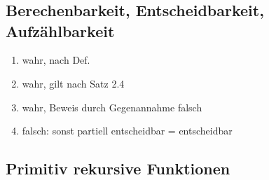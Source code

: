 \section{}
\subsection{Berechenbarkeit, Entscheidbarkeit, Aufzählbarkeit}
\begin{enumerate}
	\item wahr, nach Def.
	\item wahr, gilt nach Satz 2.4
	\item wahr, Beweis durch Gegenannahme falsch
	\item falsch: sonst partiell entscheidbar = entscheidbar
\end{enumerate}
\subsection{Primitiv rekursive Funktionen}
